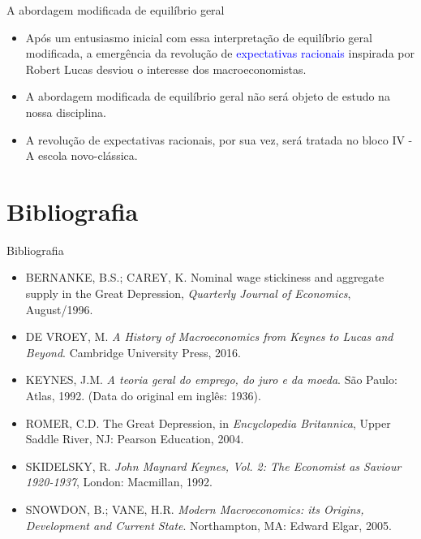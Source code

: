 \documentclass[10pt]{beamer}
\begin{document}
\begin{frame}{A abordagem modificada de equilíbrio geral}
    \begin{itemize}
        \item Após um entusiasmo inicial com essa interpretação de equilíbrio geral modificada, a emergência da revolução de \textcolor{blue}{expectativas racionais} inspirada por Robert Lucas desviou o interesse dos macroeconomistas.
        \bigskip
        \item A abordagem modificada de equilíbrio geral não será objeto de estudo na nossa disciplina.
        \bigskip
        \item A revolução de expectativas racionais, por sua vez, será tratada no bloco IV - A escola novo-clássica.
    \end{itemize}
\end{frame}

\section{Bibliografia}
\begin{frame}{ Bibliografia}
    \begin{itemize}
        \item BERNANKE, B.S.; CAREY, K. Nominal wage stickiness and aggregate supply in the Great Depression, \emph{Quarterly Journal of Economics}, August/1996.\medskip
        \item DE VROEY, M. \emph{A History of Macroeconomics from Keynes to Lucas and Beyond}. Cambridge University Press, 2016.\medskip
        \item KEYNES, J.M. \emph{A teoria geral do emprego, do juro e da moeda}. São Paulo: Atlas, 1992. (Data do original em inglês: 1936).\medskip
        \item ROMER, C.D. The Great Depression, in \emph{Encyclopedia Britannica}, Upper Saddle River, NJ: Pearson Education, 2004.\medskip
        \item SKIDELSKY, R. \emph{John Maynard Keynes, Vol. 2: The Economist as Saviour 1920-1937}, London: Macmillan, 1992.\medskip
        \item SNOWDON, B.; VANE, H.R. \emph{Modern Macroeconomics: its Origins, Development and Current State}. Northampton, MA: Edward Elgar, 2005.
    \end{itemize}
\end{frame}
\end{document}

